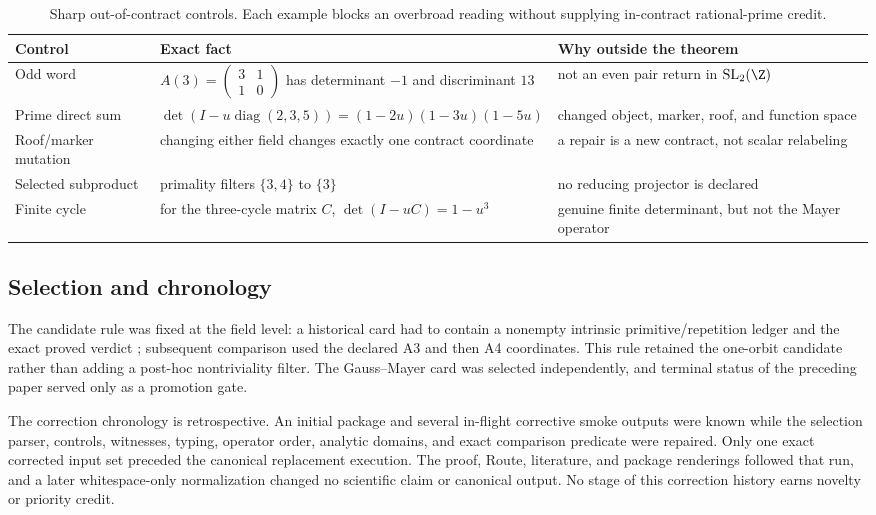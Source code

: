 \begin{table}[htbp]
\centering
\caption{Sharp out-of-contract controls.  Each example blocks an overbroad
reading without supplying in-contract rational-prime credit.}
\label{tab:countermodels}
\small
\begin{tabularx}{\textwidth}{@{}lY Y@{}}
\toprule
Control & Exact fact & Why outside the theorem \\
\midrule
Odd word
& $A(3)=\left(\begin{smallmatrix}3&1\\1&0\end{smallmatrix}\right)$ has determinant $-1$ and discriminant $13$
& not an even pair return in $\mathrm{SL}_2(\Z)$ \\
Prime direct sum
& $\det(I-u\operatorname{diag}(2,3,5))=(1-2u)(1-3u)(1-5u)$
& changed object, marker, roof, and function space \\
Roof/marker mutation
& changing either field changes exactly one contract coordinate
& a repair is a new contract, not scalar relabeling \\
Selected subproduct
& primality filters $\{3,4\}$ to $\{3\}$
& no reducing projector is declared \\
Finite cycle
& for the three-cycle matrix $C$, $\det(I-uC)=1-u^3$
& genuine finite determinant, but not the Mayer operator \\
\bottomrule
\end{tabularx}
\end{table}

\subsection{Selection and chronology}

The candidate rule was fixed at the field level: a historical card had to
contain a nonempty intrinsic primitive/repetition ledger and the exact proved
verdict ; subsequent comparison used the
declared A3 and then A4 coordinates.  This rule retained the one-orbit
candidate rather than adding a post-hoc nontriviality filter.  The
Gauss--Mayer card was selected independently, and terminal status of the
preceding paper served only as a promotion gate.

The correction chronology is retrospective.  An initial package and several
in-flight corrective smoke outputs were known while the selection parser,
controls, witnesses, typing, operator order, analytic domains, and exact
comparison predicate were repaired.  Only one exact corrected input set
preceded the canonical replacement execution.  The proof, Route, literature,
and package renderings followed that run, and a later whitespace-only
normalization changed no scientific claim or canonical output.  No stage of
this correction history earns novelty or priority credit.

